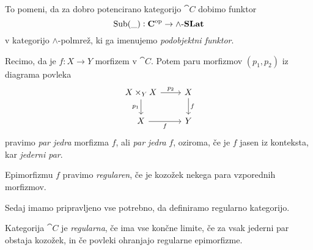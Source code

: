 \documentclass[../kategoricna_logika.tex]{subfiles}
\begin{document}
To pomeni, da za dobro potencirano kategorijo $\cat{C}$ dobimo funktor
$$\operatorname{Sub}(\_) : {\operatorname{\mathbf{C}}}^{\mathrm{op}} \to {\operatorname{\mathbf{\wedge-\mathbf{SLat}}}}$$
v kategorijo $\land$-polmrež, ki ga imenujemo \emph{podobjektni funktor}.
\begin{definicija}
  Recimo, da je $f : X \to Y$ morfizem v $\cat{C}$. Potem paru
  morfizmov $(p_1, p_2)$ iz diagrama povleka
  \begin{equation*}
    \begin{tikzcd}
      X \times_Y X \ar[d, "p_1"'] \ar[r, "p_2"] & X \ar[d, "f"] \\
      X \ar[r, "f"'] & Y
    \end{tikzcd}
  \end{equation*}
  pravimo \emph{par jedra} morfizma $f$, ali \emph{par jedra} $f$,
  oziroma, če je $f$ jasen iz konteksta, kar \emph{jederni par}.
\end{definicija}
\begin{definicija}
  Epimorfizmu $f$ pravimo \emph{regularen}, če je kozožek nekega para
  vzporednih morfizmov.
\end{definicija}
Sedaj imamo pripravljeno vse potrebno, da definiramo regularno
kategorijo.
\begin{definicija}
  Kategorija $\cat{C}$ je \emph{regularna}, če ima vse končne limite,
  če za vsak jederni par obstaja kozožek, in če povleki ohranjajo
  regularne epimorfizme.
\end{definicija}
\end{document}
